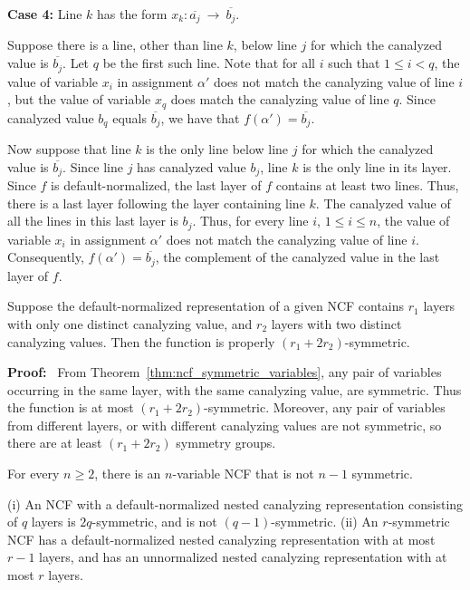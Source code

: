 \medskip

\noindent
{\bf Case 4:} Line $k$ has the form  $x_k : \overline{a_j} ~\longrightarrow~ \overline{b_j}$. 

\smallskip

Suppose there is a line, other than line $k$, below line $j$ for
which the canalyzed value is $\overline{b_j}$.  Let $q$ be the
first such line.  Note that for all $i$ such that $1 \leq i < q$,
the value of variable $x_i$ in assignment $\alpha'$ does not match
the canalyzing value of line $i$, but the value of variable $x_q$
does match the canalyzing value of line $q$.  Since canalyzed value
$b_q$ equals $\overline{b_j}$, we have that $f(\alpha') =
\overline{b_j}$.

Now suppose that line $k$ is the only line below line $j$ for which
the canalyzed value is $\overline{b_j}$.  Since line $j$ has
canalyzed value $b_j$, line $k$ is the only line in its layer.
Since $f$ is default-normalized, the last layer of $f$ contains at least
two lines.  Thus, there is a last layer following the layer containing
line $k$.  The canalyzed value of all the lines in this last layer
is $b_j$.  Thus, for every line $i$, $1 \leq i \leq n$, the value
of variable $x_i$ in assignment $\alpha'$ does not match the
canalyzing value of line $i$.  Consequently, $f(\alpha') =
\overline{b_j}$, the complement of the canalyzed value in the last
layer of $f$.  \QED

\begin{theorem}\label{thm:ncf_r_symmetric}
Suppose the default-normalized representation of a given NCF contains 
$r_1$ layers with only one distinct canalyzing value,
and $r_2$ layers with two distinct canalyzing values.
Then the function is properly $(r_1 + 2 r_2)$-symmetric.
\end{theorem}

\noindent
\textbf{Proof:}~
From Theorem~\ref{thm:ncf_symmetric_variables}, 
any pair of variables occurring in the same layer, 
with the same canalyzing value, are symmetric.
Thus the function is at most $(r_1 + 2 r_2)$-symmetric.
Moreover, any pair of variables from different layers, or with different canalyzing values
are not symmetric, so there are at least $(r_1 + 2 r_2)$ symmetry groups.
\QED

\begin{corollary}\label{cor:ncf_not_rsymm}
For every $n \geq 2$, there is an $n$-variable NCF that is not $n-1$ symmetric.
\end{corollary}

\begin{corollary}\label{cor:ncf_r_symmetric_layers}
(i) An NCF with a default-normalized nested canalyzing representation consisting
of $q$ layers is $2q$-symmetric, and is not $(q-1)$-symmetric.
(ii) An $r$-symmetric NCF has a default-normalized nested canalyzing representation
with at most $r-1$ layers, and has an unnormalized nested canalyzing
representation with at most $r$ layers.  
\end{corollary}

